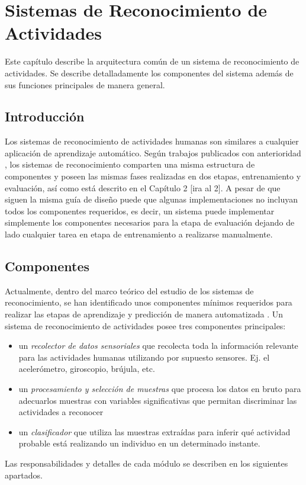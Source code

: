 
\chapter{Sistemas de Reconocimiento de Actividades }

\label{chap:sistemas-de-reconocimiento}

Este capítulo describe la arquitectura común de un sistema de reconocimiento
de actividades. Se describe detalladamente los componentes del sistema
además de sus funciones principales de manera general. 

\section{Introducción}

Los sistemas de reconocimiento de actividades humanas son similares
a cualquier aplicación de aprendizaje automático. Según trabajos publicados
con anterioridad \cite{LaraLabrador2013}, los sistemas de reconocimiento
comparten una misma estructura de componentes y poseen las mismas
fases realizadas en dos etapas, entrenamiento y evaluación, así como
está descrito en el Capítulo 2 {[}ira al 2{]}. A pesar de que siguen
la misma guía de diseño puede que algunas implementaciones no incluyan
todos los componentes requeridos, es decir, un sistema puede implementar
simplemente los componentes necesarios para la etapa de evaluación
dejando de lado cualquier tarea en etapa de entrenamiento a realizarse
manualmente. 

\section{Componentes}

Actualmente, dentro del marco teórico del estudio de los sistemas
de reconocimiento, se han identificado unos componentes mínimos requeridos
para realizar las etapas de aprendizaje y predicción de manera automatizada
\cite{choudhury2008mobile}. Un sistema de reconocimiento de actividades
posee tres componentes principales:
\begin{itemize}
\item un \emph{recolector de datos sensoriales} que recolecta toda la información
relevante para las actividades humanas utilizando por supuesto sensores.
Ej. el acelerómetro, giroscopio, brújula, etc.
\item un \emph{procesamiento y selección de muestras} que procesa los datos
en bruto para adecuarlos muestras con variables significativas que
permitan discriminar las actividades a reconocer
\item un \emph{clasificador }que utiliza las muestras extraídas para inferir
qué actividad probable está realizando un individuo en un determinado
instante.
\end{itemize}
Las responsabilidades y detalles de cada módulo se describen en los
siguientes apartados.


